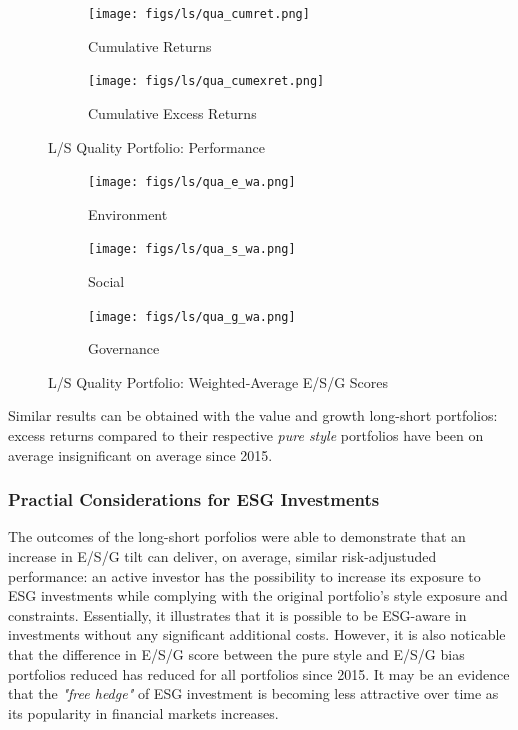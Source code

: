 \documentclass[11pt,a4paper]{article}
\begin{document}
\begin{figure}[h!]
    \centering
    \begin{subfigure}{.5\textwidth}
        \centering
        \texttt{[image: figs/ls/qua\_cumret.png]}
        \caption{Cumulative Returns}
        \label{fig:qua_cumret}
    \end{subfigure}%
    \begin{subfigure}{.5\textwidth}
      \centering
      \texttt{[image: figs/ls/qua\_cumexret.png]}
      \caption{Cumulative Excess Returns}
      \label{fig:qua_cumexret}
    \end{subfigure}
    \caption{L/S Quality Portfolio: Performance}
\end{figure}

\begin{figure}[h!]
    \centering
    \begin{subfigure}{.33\textwidth}
        \centering
        \texttt{[image: figs/ls/qua\_e\_wa.png]}
        \caption{Environment}
        \label{fig:qua_e_wa}
    \end{subfigure}%
    \begin{subfigure}{.33\textwidth}
      \centering
      \texttt{[image: figs/ls/qua\_s\_wa.png]}
      \caption{Social}
      \label{fig:qua_s_wa}
    \end{subfigure}%
    \begin{subfigure}{.33\textwidth}
        \centering
        \texttt{[image: figs/ls/qua\_g\_wa.png]}
        \caption{Governance}
        \label{fig:qua_g_wa}
      \end{subfigure}
    \caption{L/S Quality Portfolio: Weighted-Average E/S/G Scores}
\end{figure}

\begin{center}
    
    \label{tab:qua_stats}
\end{center}

Similar results can be obtained with the value and growth long-short portfolios: excess returns compared to their respective \textit{pure style} portfolios have been on average insignificant on average since 2015.

\subsubsection{Practial Considerations for ESG Investments}

The outcomes of the long-short porfolios were able to demonstrate that an increase in E/S/G tilt can deliver, on average, similar risk-adjustuded performance: an active investor has the possibility to increase its exposure to ESG investments while complying with the original portfolio's style exposure and constraints.
Essentially, it illustrates that it is possible to be ESG-aware in investments without any significant additional costs. 
However, it is also noticable that the difference in E/S/G score between the pure style and E/S/G bias portfolios reduced has reduced for all portfolios since 2015.
It may be an evidence that the \textit{"free hedge"} of ESG investment is becoming less attractive over time as its popularity in financial markets increases. 
\end{document}
